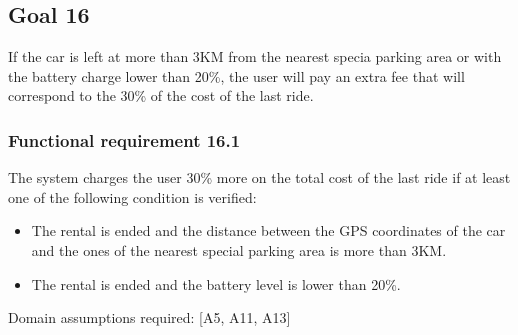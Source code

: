 \subsection{Goal 16}
If the car is left at more than 3KM from the nearest specia parking area or with the battery charge lower than 20\%, the user will pay an extra fee that will correspond to the 30\% of the cost of the last ride.

\setcounter{secnumdepth}{3}
\subsubsection{Functional requirement 16.1}
The system charges the user 30\% more on the total cost of the last ride if at least one of the following condition is verified:
\begin{itemize}
	\item The rental is ended and the distance between the GPS coordinates of the car and the ones of the nearest special parking area is more than 3KM.
	\item The rental is ended and the battery level is lower than 20\%.
\end{itemize}

\noindent Domain assumptions required: [A5, A11, A13]
